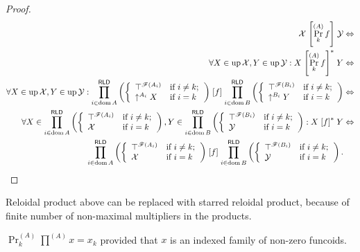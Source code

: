 \begin{proof}
~
\begin{align*}
\mathcal{X}\mathrel{\left[\Pr_{k}^{(A)}f\right]}\mathcal{Y} & \Leftrightarrow\\
\forall X\in\operatorname{up}\mathcal{X},Y\in\operatorname{up}\mathcal{Y}:X\mathrel{\left[\Pr_{k}^{(A)}f\right]^{\ast}}Y & \Leftrightarrow\\
\forall X\in\operatorname{up}\mathcal{X},Y\in\operatorname{up}\mathcal{Y}:\prod_{i\in\operatorname{dom} A}^{\mathsf{RLD}}\left(\left\{ \begin{array}{ll}
\top^{\mathscr{F}(A_{i})} & \text{if }i\neq k;\\
\uparrow^{A_{i}}X & \text{if }i=k
\end{array}\right.\right)\mathrel{\left[f\right]}\prod_{i\in\operatorname{dom} B}^{\mathsf{RLD}}\left(\left\{ \begin{array}{ll}
\top^{\mathscr{F}(B_{i})} & \text{if }i\neq k;\\
\uparrow^{B_{i}}Y & \text{if }i=k
\end{array}\right.\right) & \Leftrightarrow\\
\forall X\in\prod_{i\in\operatorname{dom} A}^{\mathsf{RLD}}\left(\left\{ \begin{array}{ll}
\top^{\mathscr{F}(A_{i})} & \text{if }i\neq k;\\
\mathcal{X} & \text{if }i=k
\end{array}\right.\right),Y\in\prod_{i\in\operatorname{dom} B}^{\mathsf{RLD}}\left(\left\{ \begin{array}{ll}
\top^{\mathscr{F}(B_{i})} & \text{if }i\neq k;\\
\mathcal{Y} & \text{if }i=k
\end{array}\right.\right):X\mathrel{\left[f\right]^{\ast}}Y & \Leftrightarrow\\
\prod_{i\in\operatorname{dom} A}^{\mathsf{RLD}}\left(\left\{ \begin{array}{ll}
\top^{\mathscr{F}(A_{i})} & \text{if }i\neq k;\\
\mathcal{X} & \text{if }i=k
\end{array}\right.\right)\mathrel{\left[f\right]}\prod_{i\in\operatorname{dom} B}^{\mathsf{RLD}}\left(\left\{ \begin{array}{ll}
\top^{\mathscr{F}(B_{i})} & \text{if }i\neq k;\\
\mathcal{Y} & \text{if }i=k
\end{array}\right.\right).
\end{align*}
\end{proof}
\begin{rem}
Reloidal product above can be replaced with starred reloidal product,
because of finite number of non-maximal multipliers in the products.\end{rem}
\begin{obvious}
$\Pr_{k}^{(A)}\prod^{(A)}x=x_{k}$ provided that $x$ is an indexed
family of non-zero funcoids.
\end{obvious}

